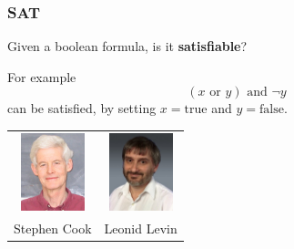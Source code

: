 \documentclass[handout, 12pt]{beamer}
\newcommand{\br}[1]{\mathopen{}\left(#1\right)\mathclose{}}
\begin{document}
\begin{frame}

\frametitle{SAT}

\begin{block}{}
Given a boolean formula, is it \textbf{satisfiable}?
\end{block}

\pause
\begin{block}{}
For example
$$\br{x\,\,\mathrm{or}\,\,y}\,\,\mathrm{and}\,\,\neg y$$
can be satisfied, by setting $x = \mathrm{true}$ and $y = \mathrm{false}$.
\end{block}

\pause
\begin{block}{}
\centering
\renewcommand{\tabcolsep}{1.5em}
\renewcommand{\arraystretch}{1}
\begin{tabular}{cc}
\includegraphics[width=5em]{pics/cook.jpg} & 
\includegraphics[width=5em]{pics/levin.jpg} \\
Stephen Cook & Leonid Levin
\end{tabular}
\end{block}

\end{frame}
\end{document}
